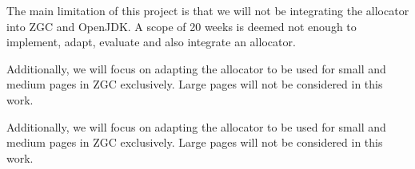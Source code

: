 
The main limitation of this project is that we will not be integrating the allocator into ZGC and OpenJDK. A scope of 20 weeks is deemed not enough to implement, adapt, evaluate and also integrate an allocator.

Additionally, we will focus on adapting the allocator to be used for small and medium pages in ZGC exclusively. Large pages will not be considered in this work.

Additionally, we will focus on adapting the allocator to be used for small and medium pages in ZGC exclusively. Large pages will not be considered in this work.


